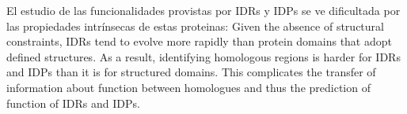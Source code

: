 % 
% 


% 
% 





El estudio de las funcionalidades provistas por IDRs y IDPs se ve dificultada por las propiedades intrínsecas de estas proteinas:
Given the absence of structural constraints, IDRs tend to evolve more rapidly than protein domains that adopt defined structures. As a result,
identifying homologous regions is harder for IDRs and IDPs than it is for structured domains.
This complicates the transfer of
information about function between homologues and thus the
prediction of function of IDRs and IDPs.

